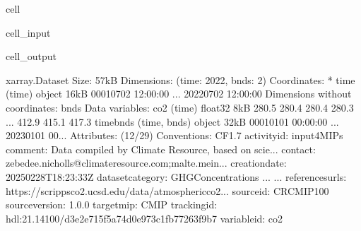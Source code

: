 \documentclass[letterpaper,10pt,english]{jupyterBook}
\begin{document}
\begin{sphinxuseclass}{cell}\begin{sphinxVerbatimInput}

\begin{sphinxuseclass}{cell_input}
\begin{sphinxVerbatim}[commandchars=\\\{\}]
\end{sphinxVerbatim}

\end{sphinxuseclass}\end{sphinxVerbatimInput}
\begin{sphinxVerbatimOutput}

\begin{sphinxuseclass}{cell_output}
\begin{sphinxVerbatim}[commandchars=\\\{\}]
\PYGZlt{}xarray.Dataset\PYGZgt{} Size: 57kB
Dimensions:    (time: 2022, bnds: 2)
Coordinates:
  * time       (time) object 16kB 0001\PYGZhy{}07\PYGZhy{}02 12:00:00 ... 2022\PYGZhy{}07\PYGZhy{}02 12:00:00
Dimensions without coordinates: bnds
Data variables:
    co2        (time) float32 8kB 280.5 280.4 280.4 280.3 ... 412.9 415.1 417.3
    time\PYGZus{}bnds  (time, bnds) object 32kB 0001\PYGZhy{}01\PYGZhy{}01 00:00:00 ... 2023\PYGZhy{}01\PYGZhy{}01 00...
Attributes: (12/29)
    Conventions:             CF\PYGZhy{}1.7
    activity\PYGZus{}id:             input4MIPs
    comment:                 Data compiled by Climate Resource, based on scie...
    contact:                 zebedee.nicholls@climate\PYGZhy{}resource.com;malte.mein...
    creation\PYGZus{}date:           2025\PYGZhy{}02\PYGZhy{}28T18:23:33Z
    dataset\PYGZus{}category:        GHGConcentrations
    ...                      ...
    references\PYGZus{}urls:         https://scrippsco2.ucsd.edu/data/atmospheric\PYGZus{}co2...
    source\PYGZus{}id:               CR\PYGZhy{}CMIP\PYGZhy{}1\PYGZhy{}0\PYGZhy{}0
    source\PYGZus{}version:          1.0.0
    target\PYGZus{}mip:              CMIP
    tracking\PYGZus{}id:             hdl:21.14100/d3e2e715\PYGZhy{}f5a7\PYGZhy{}4d0e\PYGZhy{}973c\PYGZhy{}1fb77263f9b7
    variable\PYGZus{}id:             co2
\end{sphinxVerbatim}

\end{sphinxuseclass}\end{sphinxVerbatimOutput}

\end{sphinxuseclass}
\end{document}
